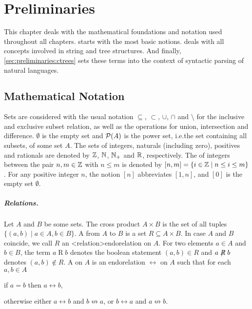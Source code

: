 \documentclass[../document.tex]{subfiles}
\begin{document}
    \chapter{Preliminaries}\label{chap:preliminaries}
    This chapter deals with the mathematical foundations and notation used throughout all chapters.
     starts with the most basic notions.
     deals with all concepts involved in string and tree structures.
    And finally, \cref{sec:preliminaries:ctrees} sets these terms into the context of syntactic parsing of natural languages.


    \section{Mathematical Notation}\label{sec:preliminaries:math}
    Sets are considered with the usual notation \(\subseteq\), \(\subset\), \(\cup\), \(\cap\) and \(\setminus\) for the inclusive and exclusive subset relation, as well as the operations for union, intersection and difference.
    \(\emptyset\) is the empty set and \(\mathcal{P}(A)\) is the power set, i.e.\@ the set containing all subsets, of some set \(A\).
    The sets of integers, naturals (including zero), positives and rationals are denoted by $\mathbb{Z}$, $\mathbb{N}$, $\mathbb{N}_+$ and $\mathbb{R}$, respectively.
    The  of integers between the pair \(n, m \in \mathbb{Z}\) with \(n \leq m\) is denoted by \([n,m] = \{i \in \mathbb{Z} \mid n \leq i \leq m\}\).
    For any positive integer \(n\), the notion \([n]\) abbreviates \([1,n]\), and \([0]\) is the empty set \(\emptyset\).

    \paragraph{Relations.}
    Let \(A\) and \(B\) be some sets.
    The cross product \(A \times B\) is the set of all tuples \(\{(a,b) \mid a \in A, b\in B\}\).
    A  from \(A\) to \(B\) is a set \(R \subseteq A \times B\).
    In case \(A\) and \(B\) coincide, we call \(R\) an <relation>{endorelation} on \(A\).
    For two elements \(a \in A\) and \(b \in B\), the term \(a \mathrel{R} b\) denotes the boolean statement \((a,b) \in R\) and \(a \not\mathrel{R} b\) denotes \((a,b) \notin R\).
    A  on \(A\) is an endorelation \(\rel\) on \(A\) such that for each \(a, b \in A\)
    \begin{inparaenum}
        \item if \(a = b\) then \(a \rel b\),
        \item otherwise either \(a \rel b\) and \(b \not\rel a\), or \(b \rel a\) and \(a \not\rel b\).
    \end{inparaenum}
\end{document}
